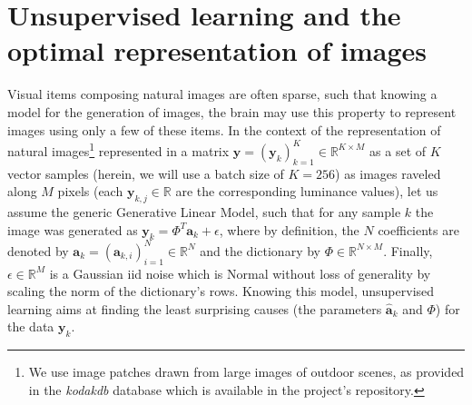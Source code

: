 \documentclass[vision,article,submit,oneauthor,pdftex]{Definitions/mdpi}
\newcommand{\coef}{\mathbf{a}} %
\newcommand{\image}{\mathbf{y}} %
\newcommand{\dico}{\Phi} %
\newcommand{\eqdef}{\ensuremath{\stackrel{\mbox{\upshape\tiny def.}}{=}}}
\newcommand{\RR}{\mathbb{R}}
\begin{document}
\section{Unsupervised learning and the optimal representation of images}%
%
%
%
Visual items composing natural images are often sparse, such that knowing a model for the generation of images, the brain may use this property to represent images using only a few of these items.
In the context of the representation of natural images\footnote{We use image patches drawn from large images of outdoor scenes, as provided in the \emph{kodakdb} database which is available in the project's repository. %
} represented in a matrix $\image = (\image_k)_{k=1}^K \in \RR^{K \times M}$ as a set of $K$ vector samples (herein, we will use a batch size of $K=256$) as images raveled along $M$ pixels (each $\image_{k, j} \in \RR$ are the corresponding luminance values), let us assume the generic Generative Linear Model, such that for any sample $k$ the image was generated as $\image_k = \dico^T \coef_{k} + \epsilon $, where by definition, the $N$ coefficients are denoted by $\coef_{k} = (\coef_{k, i})_{i=1}^N \in \RR^{N}$ and the dictionary by $\dico \in \RR^{N \times M}$. Finally, $\epsilon \in \RR^{M}$ is a Gaussian iid noise which is Normal without loss of generality by scaling the norm of the dictionary's rows. Knowing this model, unsupervised learning aims at finding the least surprising causes (the parameters $\hat{\coef}_{k}$ and $\dico$) for the data $\image_k$.
\end{document}
